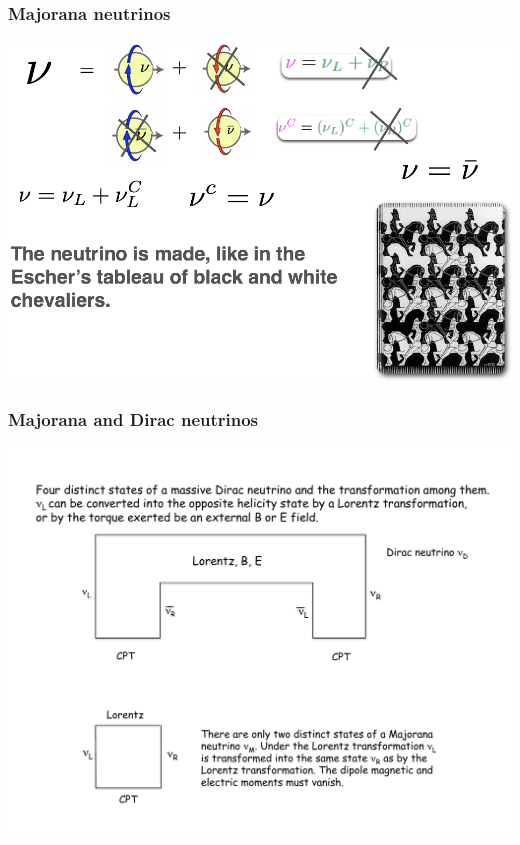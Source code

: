 \begin{frame}
\frametitle{Majorana neutrinos}
\includegraphics[scale=0.30]{img/MajoranaNeutrinosCartoon.png}
\end{frame}


\begin{frame}
\frametitle{Majorana and Dirac neutrinos}
\includegraphics[scale=0.4]{img/DiracVsMajorana2.pdf}
\end{frame}


